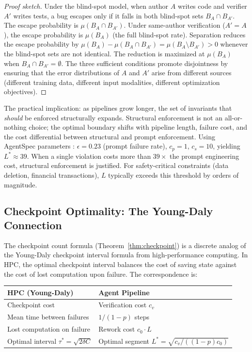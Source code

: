 \documentclass[11pt, a4paper, logo, copyright]{googledeepmind}
\begin{document}
\begin{proof}[Proof sketch]
Under the blind-spot model, when author $A$ writes code and verifier $A'$ writes tests, a bug escapes only if it falls in both blind-spot sets $B_A \cap B_{A'}$. The escape probability is $\mu(B_A \cap B_{A'})$. Under same-author verification ($A' = A$), the escape probability is $\mu(B_A)$ (the full blind-spot rate). Separation reduces the escape probability by $\mu(B_A) - \mu(B_A \cap B_{A'}) = \mu(B_A \setminus B_{A'}) > 0$ whenever the blind-spot sets are not identical. The reduction is maximized at $\mu(B_A)$ when $B_A \cap B_{A'} = \emptyset$. The three sufficient conditions promote disjointness by ensuring that the error distributions of $A$ and $A'$ arise from different sources (different training data, different input modalities, different optimization objectives).
\end{proof}

The practical implication: as pipelines grow longer, the set of invariants that \emph{should} be enforced structurally expands. Structural enforcement is not an all-or-nothing choice; the optimal boundary shifts with pipeline length, failure cost, and the cost differential between structural and prompt enforcement. Using AgentSpec parameters \citep{wang2026agentspec}: $\epsilon = 0.23$ (prompt failure rate), $c_p = 1$, $c_s = 10$, yielding $L^* \approx 39$. When a single violation costs more than $39\times$ the prompt engineering cost, structural enforcement is justified. For safety-critical constraints (data deletion, financial transactions), $L$ typically exceeds this threshold by orders of magnitude.

\subsection{Checkpoint Optimality: The Young-Daly Connection}

The checkpoint count formula (Theorem~\ref{thm:checkpoint}) is a discrete analog of the Young-Daly checkpoint interval formula \citep{young1974first, daly2006higher} from high-performance computing. In HPC, the optimal checkpoint interval balances the cost of saving state against the cost of lost computation upon failure. The correspondence is:

\begin{center}
\small
\begin{tabular}{ll}
\toprule
\textbf{HPC (Young-Daly)} & \textbf{Agent Pipeline} \\
\midrule
Checkpoint cost & Verification cost $c_v$ \\
Mean time between failures & $1/(1-p)$ steps \\
Lost computation on failure & Rework cost $c_0 \cdot L$ \\
Optimal interval $\tau^* = \sqrt{2 \delta C}$ & Optimal segment $L^* = \sqrt{c_v / ((1-p) c_0)}$ \\
\bottomrule
\end{tabular}
\end{center}
\end{document}
